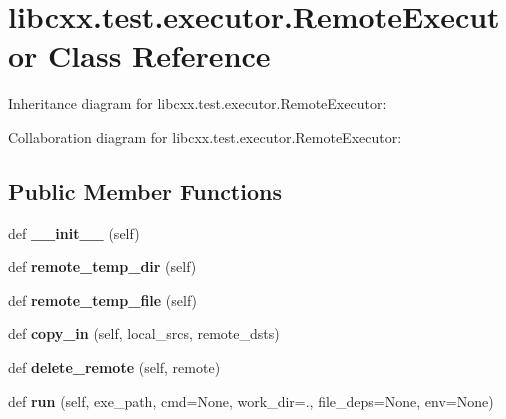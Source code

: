\hypertarget{classlibcxx_1_1test_1_1executor_1_1_remote_executor}{}\section{libcxx.\+test.\+executor.\+Remote\+Executor Class Reference}
\label{classlibcxx_1_1test_1_1executor_1_1_remote_executor}


Inheritance diagram for libcxx.\+test.\+executor.\+Remote\+Executor\+:


Collaboration diagram for libcxx.\+test.\+executor.\+Remote\+Executor\+:
\subsection*{Public Member Functions}
\begin{DoxyCompactItemize}
\item 
\mbox{\label{classlibcxx_1_1test_1_1executor_1_1_remote_executor_a8765833b79a24548fb046048fe69baba}} 
def {\bfseries \+\_\+\+\_\+init\+\_\+\+\_\+} (self)
\item 
\mbox{\label{classlibcxx_1_1test_1_1executor_1_1_remote_executor_a9ba3cf4491c904f369303643bfe5f30b}} 
def {\bfseries remote\+\_\+temp\+\_\+dir} (self)
\item 
\mbox{\label{classlibcxx_1_1test_1_1executor_1_1_remote_executor_afb9e3bafc3298dc8140292fad45f7d6a}} 
def {\bfseries remote\+\_\+temp\+\_\+file} (self)
\item 
\mbox{\label{classlibcxx_1_1test_1_1executor_1_1_remote_executor_a37e530a1b90cbc2da9b63bfe375b9bb0}} 
def {\bfseries copy\+\_\+in} (self, local\+\_\+srcs, remote\+\_\+dsts)
\item 
\mbox{\label{classlibcxx_1_1test_1_1executor_1_1_remote_executor_ac03bf77066594de8204f6100e78919a0}} 
def {\bfseries delete\+\_\+remote} (self, remote)
\item 
\mbox{\label{classlibcxx_1_1test_1_1executor_1_1_remote_executor_a8e0df2560386fc36c5c8dc8f9aa0fabf}} 
def {\bfseries run} (self, exe\+\_\+path, cmd=None, work\+\_\+dir=\textquotesingle{}.\textquotesingle{}, file\+\_\+deps=None, env=None)
\end{DoxyCompactItemize}
